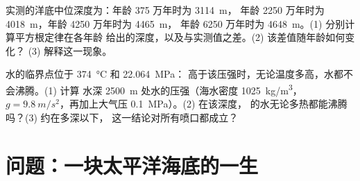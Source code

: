 \begin{exercise}[$\star\star\star$]\label{exo:g11:ocean-ridges:14}
实测的洋底中位深度为：年龄 375 万年时为 \qty{3114}{m}，
年龄 2250 万年时为 \qty{4018}{m}，年龄 4250 万年时为 \qty{4465}{m}，
年龄 6250 万年时为 \qty{4648}{m}。(1) 分别计算平方根定律在各年龄
给出的深度，以及与实测值之差。(2) 该差值随年龄如何变化？
(3) 解释这一现象。
\end{exercise}

\begin{exercise}[$\star\star\star$]\label{exo:g11:ocean-ridges:15}
水的临界点位于 \qty{374}{\celsius} 和 \qty{22.064}{MPa}：
高于该压强时，无论温度多高，水都不会沸腾。(1) 计算
水深 \qty{2500}{m} 处水的压强（海水密度 \qty{1025}{kg/m^3}，
$g = \qty{9.8}{m/s^2}$，再加上大气压 \qty{0.1}{MPa}）。(2) 在该深度，
的水无论多热都能沸腾吗？(3) 约在多深以下，
这一结论对所有喷口都成立？
\end{exercise}

\section{问题：一块太平洋海底的一生}

